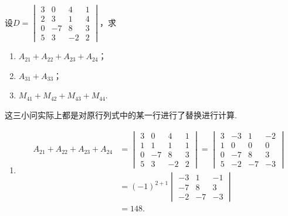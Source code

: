 \begin{exercise}
\begin{exgroup}
    \end{exgroup}

    \begin{exgroup}
        \item 设$D=\begin{vmatrix}
                3 & 0 & 4 & 1 \\ 2 & 3 & 1 & 4 \\ 0 & -7 & 8 & 3 \\ 5 & 3 & -2 & 2
            \end{vmatrix}$，求
        \begin{enumerate}
            \item $A_{21}+A_{22}+A_{23}+A_{24}$；

            \item $A_{31}+A_{33}$；

            \item $M_{41}+M_{42}+M_{43}+M_{44}$.
        \end{enumerate}
        \begin{answer}
            这三小问实际上都是对原行列式中的某一行进行了替换进行计算.
            \begin{enumerate}
                \item \begin{align*}
                            A_{21}+A_{22}+A_{23}+A_{24}
                            & = \begin{vmatrix}
                                    3 & 0  & 4  & 1 \\
                                    1 & 1  & 1  & 1 \\
                                    0 & -7 & 8  & 3 \\
                                    5 & 3  & -2 & 2
                                \end{vmatrix}
                            = \begin{vmatrix}
                                3 & -3 & 1  & -2 \\
                                1 & 0  & 0  & 0  \\
                                0 & -7 & 8  & 3  \\
                                5 & -2 & -7 & -3
                            \end{vmatrix}             \\
                            & = (-1)^{2+1} \begin{vmatrix}
                                                -3 & 1  & -1 \\
                                                -7 & 8  & 3  \\
                                                -2 & -7 & -3
                                            \end{vmatrix} \\
                            & = 148.
                        \end{align*}


\end{enumerate}
\end{answer}
\end{exgroup}
\end{exercise}
